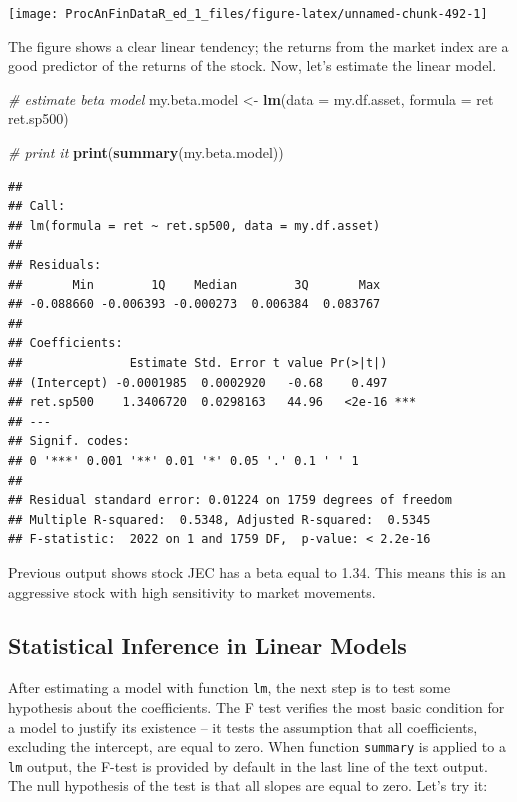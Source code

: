 \documentclass[11pt,]{book}
\newenvironment{Shaded}{\begin{snugshade}}{\end{snugshade}}
\newcommand{\KeywordTok}[1]{\textcolor[rgb]{0.27,0.27,0.27}{\textbf{#1}}}
\newcommand{\DataTypeTok}[1]{\textcolor[rgb]{0.27,0.27,0.27}{#1}}
\newcommand{\StringTok}[1]{\textcolor[rgb]{0.5,0.5,0.5}{#1}}
\newcommand{\CommentTok}[1]{\textcolor[rgb]{0.56,0.35,0.01}{\textit{#1}}}
\newcommand{\OperatorTok}[1]{\textcolor[rgb]{0.81,0.36,0.00}{\textbf{#1}}}
\newcommand{\NormalTok}[1]{#1}
\begin{document}
\begin{center}\texttt{[image: ProcAnFinDataR\_ed\_1\_files/figure-latex/unnamed-chunk-492-1]} \end{center}

The figure shows a clear linear tendency; the returns from the market
index are a good predictor of the returns of the stock. Now, let's
estimate the linear model.

\begin{Shaded}
\begin{Highlighting}[]
\CommentTok{# estimate beta model}
\NormalTok{my.beta.model <-}\StringTok{ }\KeywordTok{lm}\NormalTok{(}\DataTypeTok{data =}\NormalTok{ my.df.asset, }\DataTypeTok{formula =}\NormalTok{ ret }\OperatorTok{~}\StringTok{ }\NormalTok{ret.sp500)}

\CommentTok{# print it}
\KeywordTok{print}\NormalTok{(}\KeywordTok{summary}\NormalTok{(my.beta.model))}
\end{Highlighting}
\end{Shaded}

\begin{verbatim}
## 
## Call:
## lm(formula = ret ~ ret.sp500, data = my.df.asset)
## 
## Residuals:
##       Min        1Q    Median        3Q       Max 
## -0.088660 -0.006393 -0.000273  0.006384  0.083767 
## 
## Coefficients:
##               Estimate Std. Error t value Pr(>|t|)    
## (Intercept) -0.0001985  0.0002920   -0.68    0.497    
## ret.sp500    1.3406720  0.0298163   44.96   <2e-16 ***
## ---
## Signif. codes:  
## 0 '***' 0.001 '**' 0.01 '*' 0.05 '.' 0.1 ' ' 1
## 
## Residual standard error: 0.01224 on 1759 degrees of freedom
## Multiple R-squared:  0.5348, Adjusted R-squared:  0.5345 
## F-statistic:  2022 on 1 and 1759 DF,  p-value: < 2.2e-16
\end{verbatim}

Previous output shows stock JEC has a beta equal to 1.34. This means
this is an aggressive stock with high sensitivity to market movements.

\subsection{Statistical Inference in Linear Models}\label{testing-ols}

After estimating a model with function \texttt{lm}, the next step is to
test some hypothesis about the coefficients. The F test verifies the
most basic condition for a model to justify its existence -- it tests
the assumption that all coefficients, excluding the intercept, are equal
to zero. When function \texttt{summary} is applied to a \texttt{lm}
output, the F-test is provided by default in the last line of the text
output. The null hypothesis of the test is that all slopes are equal to
zero. Let's try it:
\end{document}
